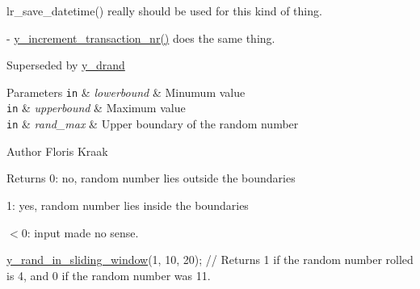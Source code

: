 \begin{DoxyRefList}
\item[\label{deprecated__deprecated000008}%
\hypertarget{deprecated__deprecated000008}{}%
Member \hyperlink{y__logging_8c_af5f7233cc156519f399367ba558adba8}{y\-\_\-make\-\_\-datetimestamp} (time\-\_\-t time, unsigned short millitm)]lr\-\_\-save\-\_\-datetime() really should be used for this kind of thing.  
\item[\label{deprecated__deprecated000015}%
\hypertarget{deprecated__deprecated000015}{}%
Member \hyperlink{y__transaction_8c_a4ce1cf19821f9eabdc90e247270c99bc}{y\-\_\-post\-\_\-increment\-\_\-transaction\-\_\-nr} ()]-\/ \hyperlink{y__transaction_8c_a7672d883aaf18287c950c985ce4d3f95}{y\-\_\-increment\-\_\-transaction\-\_\-nr()} does the same thing. 
\item[\label{deprecated__deprecated000001}%
\hypertarget{deprecated__deprecated000001}{}%
Member \hyperlink{group__core_ga0419985b32761cce3f5d75e6aad36f05}{y\-\_\-rand} (void)]Superseded by \hyperlink{group__core_ga319710d6642f34a8ea51a1a9898869fc}{y\-\_\-drand}  
\item[\label{deprecated__deprecated000006}%
\hypertarget{deprecated__deprecated000006}{}%
Member \hyperlink{group__loadrunner__utils_gae983b9ef76c2dac577cd9bb17920b6ea}{y\-\_\-rand\-\_\-in\-\_\-sliding\-\_\-window} (int lowerbound, int upperbound, int rand\-\_\-max)]
\begin{DoxyParams}[1]{Parameters}
\mbox{\tt in}  & {\em lowerbound} & Minumum value \\
\hline
\mbox{\tt in}  & {\em upperbound} & Maximum value \\
\hline
\mbox{\tt in}  & {\em rand\-\_\-max} & Upper boundary of the random number \\
\hline
\end{DoxyParams}
\begin{DoxyAuthor}{Author}
Floris Kraak 
\end{DoxyAuthor}
\begin{DoxyReturn}{Returns}
0\-: no, random number lies outside the boundaries\par
 1\-: yes, random number lies inside the boundaries\par
 $<$0\-: input made no sense. 
\begin{DoxyCode}
\hyperlink{group__loadrunner__utils_gae983b9ef76c2dac577cd9bb17920b6ea}{y\_rand\_in\_sliding\_window}(1, 10, 20); \textcolor{comment}{// Returns 1 if the random number rolled is 4,
       and 0 if the random number was 11.}
\end{DoxyCode}
 

\end{DoxyReturn}
\end{DoxyRefList}

